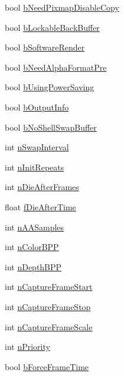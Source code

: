 \begin{DoxyCompactItemize}
bool \hyperlink{struct_p_v_r_shell_data_aace01d10102fd454f9238554e2be6e13}{b\+Need\+Pixmap\+Disable\+Copy}
\item 
bool \hyperlink{struct_p_v_r_shell_data_abfcfeee3305dc2b03b754e0d17f7175a}{b\+Lockable\+Back\+Buffer}
\item 
bool \hyperlink{struct_p_v_r_shell_data_a00023238c5b38ebd6a2da64d61084465}{b\+Software\+Render}
\item 
bool \hyperlink{struct_p_v_r_shell_data_a91a9c0aa9e8a90aac672cbe6d2bdae1a}{b\+Need\+Alpha\+Format\+Pre}
\item 
bool \hyperlink{struct_p_v_r_shell_data_ac0fb0a4fe6f36e7cf6b3aba9340a58c3}{b\+Using\+Power\+Saving}
\item 
bool \hyperlink{struct_p_v_r_shell_data_a4c2223efb52a1872dc001f2847c5bc30}{b\+Output\+Info}
\item 
bool \hyperlink{struct_p_v_r_shell_data_a7b5110e4d5f7b25326f2513348f5a644}{b\+No\+Shell\+Swap\+Buffer}
\item 
int \hyperlink{struct_p_v_r_shell_data_a9584c6b96d5a88d83e1055f9f09d2f3f}{n\+Swap\+Interval}
\item 
int \hyperlink{struct_p_v_r_shell_data_aaf4d946fde1e9a938ac709f6c8e5089e}{n\+Init\+Repeats}
\item 
int \hyperlink{struct_p_v_r_shell_data_a46494a2f4df91ac2e7e3ef2430b9ccf0}{n\+Die\+After\+Frames}
\item 
float \hyperlink{struct_p_v_r_shell_data_af4154e01863950b5ee5d873022ed5ccd}{f\+Die\+After\+Time}
\item 
int \hyperlink{struct_p_v_r_shell_data_a5080b2dd00695a9c75d8b548ffad438f}{n\+A\+A\+Samples}
\item 
int \hyperlink{struct_p_v_r_shell_data_a59a2d6c199f7bc5d4c6cd8498f773412}{n\+Color\+B\+P\+P}
\item 
int \hyperlink{struct_p_v_r_shell_data_a0adbe200c73f63fd21c5ad5479d56033}{n\+Depth\+B\+P\+P}
\item 
int \hyperlink{struct_p_v_r_shell_data_ae8f0afe7e59a66850cf7f3ba4a158088}{n\+Capture\+Frame\+Start}
\item 
int \hyperlink{struct_p_v_r_shell_data_aeb706d61964c8bc8fd9b56936348a377}{n\+Capture\+Frame\+Stop}
\item 
int \hyperlink{struct_p_v_r_shell_data_aeaf6bee7668691d9336c66d4220334df}{n\+Capture\+Frame\+Scale}
\item 
int \hyperlink{struct_p_v_r_shell_data_ad1df1cdd6c70e9e90a007c7cd737b191}{n\+Priority}
\item 
bool \hyperlink{struct_p_v_r_shell_data_a102519b3c44090d80d95b863c3bab1ce}{b\+Force\+Frame\+Time}

\end{DoxyCompactItemize}
